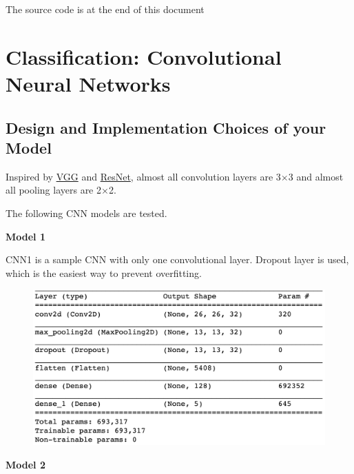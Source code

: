 \documentclass[12pt]{article}
\begin{document}
\noindent
{\LARGE The source code is at the end of this document}
\section{Classification: Convolutional Neural Networks}

\subsection{Design and Implementation Choices of your Model}

Inspired by \href{https://arxiv.org/pdf/1409.1556.pdf}{VGG} and \href{https://arxiv.org/pdf/1512.03385.pdf}{ResNet}, almost all convolution layers are 3$\times$3 and almost all pooling layers are 2$\times$2.

The following CNN models are tested. 

\textbf{Model 1}

CNN1 is a sample CNN with only one convolutional layer. Dropout layer is used, which is the easiest way to prevent overfitting.
\begin{figure}[H]
\begin{center}
    \includegraphics[width=1.0\textwidth]{./plots/1.png}
\end{center}
\end{figure}
\vspace*{-1.0cm}

\textbf{Model 2}
\end{document}
